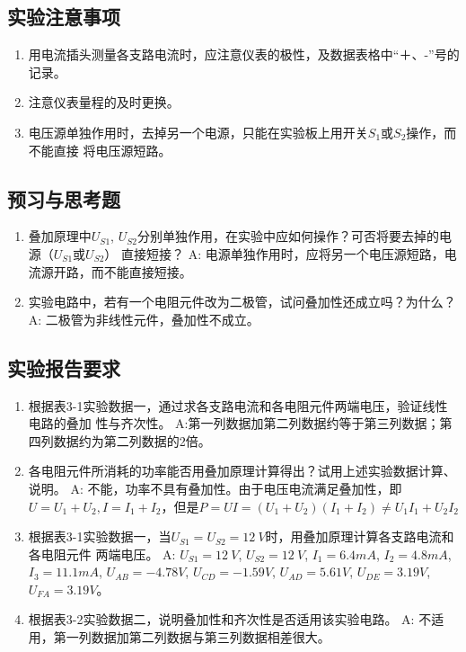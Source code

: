 \documentclass[UTF8]{article}
\begin{document}
        \subsection{实验注意事项}
            \begin{enumerate}[label=\textbf{\arabic*}.]
                \item 用电流插头测量各支路电流时，应注意仪表的极性，及数据表格中“＋、-”号的记录。
                \item 注意仪表量程的及时更换。
                \item 电压源单独作用时，去掉另一个电源，只能在实验板上用开关$S_1$或$S_2$操作，而不能直接
                将电压源短路。 
            \end{enumerate}
        \subsection{预习与思考题}
            \begin{enumerate}[label=\textbf{\arabic*}.]
                \item 叠加原理中$U_{S1}$, $U_{S2}$分别单独作用，在实验中应如何操作？可否将要去掉的电源（$U_{S1}$或${U_{S2}}$）
                直接短接？\newline
                A: 电源单独作用时，应将另一个电压源短路，电流源开路，而不能直接短接。
                \item 实验电路中，若有一个电阻元件改为二极管，试问叠加性还成立吗？为什么？\newline
                A: 二极管为非线性元件，叠加性不成立。
            \end{enumerate}
        \subsection{实验报告要求}
            \begin{enumerate}[label=\textbf{\arabic*}.]
                \item 根据表3-1实验数据一，通过求各支路电流和各电阻元件两端电压，验证线性电路的叠加
                性与齐次性。\newline
                A:第一列数据加第二列数据约等于第三列数据；第四列数据约为第二列数据的2倍。
                \item 各电阻元件所消耗的功率能否用叠加原理计算得出？试用上述实验数据计算、说明。\newline
                A: 不能，功率不具有叠加性。由于电压电流满足叠加性，即$U = U_1 + U_2, I = I_1 + I_2$，但是$P = UI = (U_1+U_2)(I_1+I_2) \neq U_1 I_1+U_2 I_2$
                \item 根据表3-1实验数据一，当$U_{S1} = U_{S2} = \SI{12}{V}$时，用叠加原理计算各支路电流和各电阻元件
                两端电压。 \newline
                A: $U_{S1} = \SI{12}{V}$, $U_{S2} = \SI{12}{V}$, $I_1 = 6.4mA$, $I_2 = 4.8mA$, $I_3 = 11.1mA$, 
                $U_{AB} = -4.78V$, $U_{CD} = -1.59V$, $U_{AD} = 5.61V$, $U_{DE} = 3.19V$, $U_{FA} = 3.19V$。
                \item 根据表3-2实验数据二，说明叠加性和齐次性是否适用该实验电路。\newline
                A: 不适用，第一列数据加第二列数据与第三列数据相差很大。
            \end{enumerate}
\end{document}
